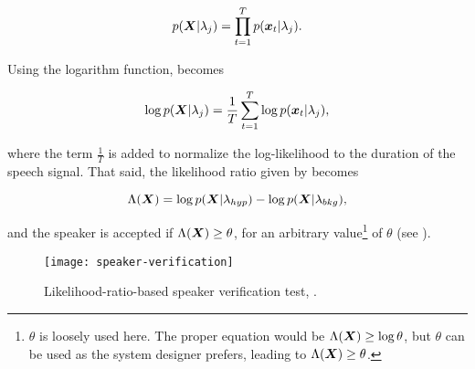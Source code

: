 \begin{equation}
    p(\dvec{X}|\lambda_j) = \prod_{t=1}^T p(\dvec{x}_t|\lambda_j).
    \label{eq:likelihood-prod}
\end{equation}

\noindent Using the logarithm function,  becomes

\begin{equation}
    \log p(\dvec{X}|\lambda_j) = \frac{1}{T} \sum_{t=1}^T \log p(\dvec{x}_t|\lambda_j),
    \label{eq:log-likelihood-sum}
\end{equation}

\noindent where the term $\frac{1}{T}$ is added to normalize the log-likelihood to the duration of the speech signal. That said, the likelihood ratio given by  becomes

\begin{equation}
    \Lambda(\dvec{X}) = \log p(\dvec{X}|\lambda_{hyp}) - \log p(\dvec{X}|\lambda_{bkg}),
    \label{eq:score_of_X}
\end{equation}

\noindent and the speaker is accepted if $\Lambda(\boldsymbol{X}) \geq \theta$, for an arbitrary value\footnote{$\theta$ is loosely used here. The proper equation would be $\Lambda(\boldsymbol{X}) \geq \log\theta$, but $\theta$ can be used as the system designer prefers, leading to $\Lambda(\boldsymbol{X}) \geq \theta$.} of $\theta$ (see ).

\begin{figure}[ht]
    \centering
    \texttt{[image: speaker-verification]}
    \caption{Likelihood-ratio-based speaker verification test, .}
    \label{fig:speaker-verification}
\end{figure}